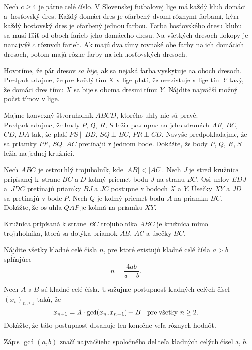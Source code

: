 {%
Nech $c\ge4$ je párne celé číslo. V Slovenskej futbalovej lige má každý klub domáci a~hosťovský dres. Každý domáci dres je ofarbený dvomi rôznymi farbami, kým každý hosťovský dres je ofarbený jednou farbou. Farba hosťovského dresu klubu sa musí líšiť od oboch farieb jeho domáceho dresu. Na všetkých dresoch dokopy je nanajvýš $c$ rôznych farieb. Ak majú dva tímy rovnaké obe farby na ich domácich dresoch, potom majú rôzne farby na ich hosťovských dresoch.

Hovoríme, že pár dresov \emph{sa bije}, ak sa nejaká farba vyskytuje na oboch dresoch. Predpokladajme, že pre každý tím $X$ v lige platí, že neexistuje v lige tím $Y$ taký, že domáci dres tímu $X$ sa bije s oboma dresmi tímu $Y$. Nájdite najväčší možný počet tímov v lige.}

{%
Majme konvexný štvoruholník $ABCD$, ktorého uhly nie sú pravé. Predpokladajme, že body $P$, $Q$, $R$, $S$ ležia postupne na jeho stranách $AB$, $BC$, $CD$, $DA$ tak, že platí $PS \parallel BD$, $SQ \perp BC$, $PR \perp CD$. Navyše predpokladajme, že sa priamky $PR$, $SQ$, $AC$ pretínajú v jednom bode. Dokážte, že body $P$, $Q$, $R$, $S$ ležia na jednej kružnici.}

{%
Nech $ABC$ je ostrouhlý trojuholník, kde $|AB| < |AC|$. Nech $J$ je stred kružnice pripísanej k~strane $BC$ a $D$ kolmý priemet bodu $J$ na stranu $BC$. Osi uhlov $BDJ$ a~$JDC$ pretínajú priamky $BJ$ a $JC$ postupne v bodoch $X$ a $Y$. Úsečky $XY$ a $JD$ sa pretínajú v bode $P$. Nech $Q$ je kolmý priemet bodu $A$ na priamku $BC$. Dokážte, že os uhla $QAP$ je kolmá na priamku $XY$.

\poznamka
Kružnica pripísaná k strane $BC$ trojuholníka $ABC$ je kružnica mimo trojuholníka, ktorá sa dotýka priamok $AB$, $AC$ a úsečky $BC$.
}

{%
Nájdite všetky kladné celé čísla $n$, pre ktoré existujú kladné celé čísla $a > b$ spĺňajúce
$$
n = \frac{4ab}{a-b}.
$$
}

{%
Nech $A$ a $B$ sú kladné celé čísla. Uvažujme postupnosť kladných celých čísel $(x_n)_{n \geq 1}$ takú, že
$$
\postdisplaypenalty=10000
x_{n+1}=A \cdot \gcd(x_n, x_{n-1})+B\quad \text{pre všetky $n \geq 2$.} 
$$
Dokážte, že táto postupnosť dosahuje len konečne veľa rôznych hodnôt.

\poznamka
Zápis $\gcd(a, b)$ značí najväčšieho spoločného deliteľa kladných celých čísel $a$, $b$.
}

